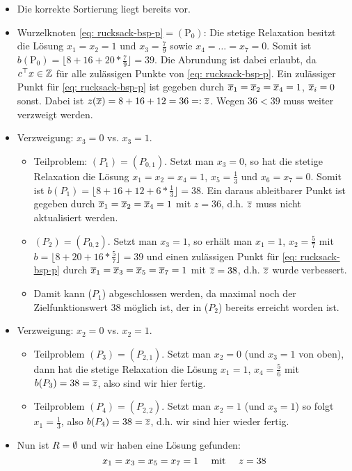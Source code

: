 \begin{beispiel}
	\begin{itemize}[leftmargin=*]
		\item Die korrekte Sortierung liegt bereits vor.
		\item Wurzelknoten \eqref{eq: rucksack-bsp-p}$=(\text{P}_0)$: Die stetige Relaxation besitzt die Lösung $x_1 = x_2 = 1$ und $x_3 = \frac{7}{9}$ sowie $x_4 = \dots = x_7 = 0$. Somit ist $b(\text{P}_0) = \lfloor 8 + 16 + 20 * \frac{7}{9} \rfloor = 39$. Die Abrundung ist dabei erlaubt, da $\trans{c} x \in \Z$ für alle zulässigen Punkte von \eqref{eq: rucksack-bsp-p}. Ein zulässiger Punkt für \eqref{eq: rucksack-bsp-p} ist gegeben durch $\quer{x}_1 = \quer{x}_2 = \quer{x}_4 = 1$, $\quer{x}_i = 0$ sonst. Dabei ist $z(\quer{x}) = 8 + 16 + 12 = 36 \defqe \quer{z}$. Wegen $36 < 39$ muss weiter verzweigt werden.
		\item Verzweigung: $x_3 = 0$ vs. $x_3 = 1$.
		\begin{itemize}
			\item Teilproblem: $(P_1) = (P_{0,1})$. Setzt man $x_3 = 0$, so hat die stetige Relaxation die Lösung $x_1 = x_2 = x_4 = 1$, $x_5 = \frac{1}{3}$ und $x_6 = x_7 = 0$. Somit ist $b(P_1) = \lfloor 8 + 16 + 12 + 6 * \frac{1}{3} \rfloor = 38$. Ein daraus ableitbarer Punkt ist gegeben durch $\quer{x}_1 = \quer{x}_2 = \quer{x}_4 = 1$ mit $z = 36$, d.h. $\quer{z}$ muss nicht aktualisiert werden.
			\item $(P_2) = (P_{0,2})$. Setzt man $x_3 = 1$, so erhält man $x_1 = 1$, $x_2 = \frac{5}{7}$ mit $b = \lfloor 8 + 20 + 16 * \frac{5}{7} \rfloor = 39$ und einen zulässigen Punkt für \eqref{eq: rucksack-bsp-p} durch $\quer{x}_1 = \quer{x}_3 = \quer{x}_5 = \quer{x}_7 = 1$ mit $\quer{z} = 38$, d.h. $\quer{z}$ wurde verbessert.
			\item Damit kann ($P_1$) abgeschlossen werden, da maximal noch der Zielfunktionswert $38$ möglich ist, der in ($P_2$) bereits erreicht worden ist.
		\end{itemize}
		\item Verzweigung: $x_2 = 0$ vs. $x_2 = 1$.
		\begin{itemize}
			\item Teilproblem $(P_3) = (P_{2,1})$. Setzt man $x_2 = 0$ (und $x_3 = 1$ von oben), dann hat die stetige Relaxation die Lösung $x_1 = 1$, $x_4 = \frac{5}{6}$ mit $b(P_3) = 38 = \quer{z}$, also sind wir hier fertig.
			\item Teilproblem $(P_4) = (P_{2,2})$. Setzt man $x_2 = 1$ (und $x_3 = 1$) so folgt $x_1 = \frac{1}{3}$, also $b(P_4) = 38 = \quer{z}$, d.h. wir sind hier wieder fertig.
		\end{itemize}
		\item Nun ist $R = \emptyset$ und wir haben eine Lösung gefunden:
		\begin{equation*}
			x_1 = x_3 = x_5 = x_7 = 1 \quad \mit \quad z = 38
		\end{equation*}
	\end{itemize}
\end{beispiel}


